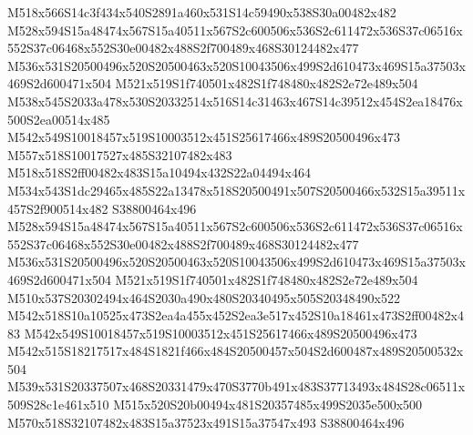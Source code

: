 \documentclass{article}
\begin{document}
\begin{multicols}{2}
M518x566S14c3f434x540S2891a460x531S14c59490x538S30a00482x482 M528x594S15a48474x567S15a40511x567S2c600506x536S2c611472x536S37c06516x552S37c06468x552S30e00482x488S2f700489x468S30124482x477 M536x531S20500496x520S20500463x520S10043506x499S2d610473x469S15a37503x469S2d600471x504 M521x519S1f740501x482S1f748480x482S2e72e489x504 M538x545S2033a478x530S20332514x516S14c31463x467S14c39512x454S2ea18476x500S2ea00514x485 M542x549S10018457x519S10003512x451S25617466x489S20500496x473 M557x518S10017527x485S32107482x483 M518x518S2ff00482x483S15a10494x432S22a04494x464 M534x543S1dc29465x485S22a13478x518S20500491x507S20500466x532S15a39511x457S2f900514x482 S38800464x496 M528x594S15a48474x567S15a40511x567S2c600506x536S2c611472x536S37c06516x552S37c06468x552S30e00482x488S2f700489x468S30124482x477 M536x531S20500496x520S20500463x520S10043506x499S2d610473x469S15a37503x469S2d600471x504 M521x519S1f740501x482S1f748480x482S2e72e489x504 M510x537S20302494x464S2030a490x480S20340495x505S20348490x522 M542x518S10a10525x473S2ea4a455x452S2ea3e517x452S10a18461x473S2ff00482x483 M542x549S10018457x519S10003512x451S25617466x489S20500496x473 M542x515S18217517x484S1821f466x484S20500457x504S2d600487x489S20500532x504 M539x531S20337507x468S20331479x470S3770b491x483S37713493x484S28c06511x509S28c1e461x510 M515x520S20b00494x481S20357485x499S2035e500x500 M570x518S32107482x483S15a37523x491S15a37547x493 S38800464x496










\end{multicols}
\end{document}
